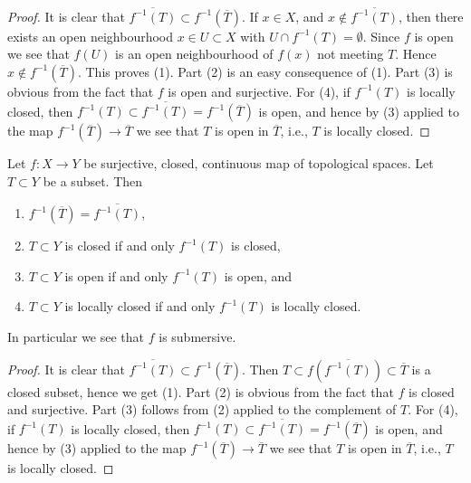 \begin{proof}
It is clear that $\overline{f^{-1}(T)} \subset f^{-1}(\overline{T})$.
If $x \in X$, and $x \not \in \overline{f^{-1}(T)}$, then there
exists an open neighbourhood $x \in U \subset X$ with
$U \cap f^{-1}(T) = \emptyset$. Since $f$ is open we see that
$f(U)$ is an open neighbourhood of $f(x)$ not meeting $T$.
Hence $x \not \in f^{-1}(\overline{T})$. This proves (1).
Part (2) is an easy consequence of (1).
Part (3) is obvious from the fact that $f$ is open and surjective.
For (4), if $f^{-1}(T)$ is locally closed, then
$f^{-1}(T) \subset \overline{f^{-1}(T)} = f^{-1}(\overline{T})$
is open, and hence by (3) applied to the map
$f^{-1}(\overline{T}) \to \overline{T}$ we see that
$T$ is open in $\overline{T}$, i.e., $T$ is locally closed.
\end{proof}

\begin{lemma}
\label{lemma-closed-morphism-quotient-topology}
Let $f : X \to Y$ be surjective, closed, continuous map of topological spaces.
Let $T \subset Y$ be a subset. Then
\begin{enumerate}
\item $f^{-1}(\overline{T}) = \overline{f^{-1}(T)}$,
\item $T \subset Y$ is closed if and only $f^{-1}(T)$ is closed,
\item $T \subset Y$ is open if and only $f^{-1}(T)$ is open, and
\item $T \subset Y$ is locally closed if and only $f^{-1}(T)$ is locally closed.
\end{enumerate}
In particular we see that $f$ is submersive.
\end{lemma}

\begin{proof}
It is clear that $\overline{f^{-1}(T)} \subset f^{-1}(\overline{T})$.
Then $T \subset f(\overline{f^{-1}(T)}) \subset \overline{T}$
is a closed subset, hence we get (1). Part (2) is obvious from
the fact that $f$ is closed and surjective.
Part (3) follows from (2) applied to the complement of $T$.
For (4), if $f^{-1}(T)$ is locally closed, then
$f^{-1}(T) \subset \overline{f^{-1}(T)} = f^{-1}(\overline{T})$
is open, and hence by (3) applied to the map
$f^{-1}(\overline{T}) \to \overline{T}$ we see that
$T$ is open in $\overline{T}$, i.e., $T$ is locally closed.
\end{proof}










